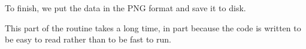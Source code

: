 To finish, we put the data in the PNG format and save it to 
disk.

This part of the routine takes a long time, in part because
the code is written to be easy to read rather than to be fast to run.

\endinput


TODO:
1) mention Sage matrices are not mutable in matrix introduction.
Is mutable discussed in Intro?

2) vectors have to be forced to be row or col

2) Need int() fcns?  copy() fcn?